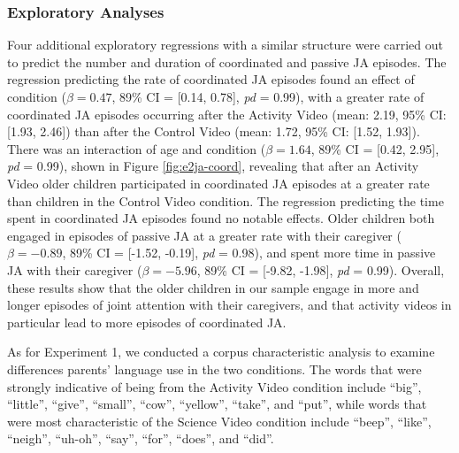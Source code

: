 \documentclass[man,floatsintext]{apa6}
\begin{document}
\hypertarget{exploratory-analyses-1}{%
\subsubsection{Exploratory Analyses}\label{exploratory-analyses-1}}

Four additional exploratory regressions with a similar structure were carried out to predict the number and duration of coordinated and passive JA episodes.
The regression predicting the rate of coordinated JA episodes found an effect of condition (\(\beta=0.47\), 89\% CI = {[}0.14, 0.78{]}, \emph{pd} = 0.99), with a greater rate of coordinated JA episodes occurring after the Activity Video (mean: 2.19, 95\% CI: {[}1.93, 2.46{]}) than after the Control Video (mean: 1.72, 95\% CI: {[}1.52, 1.93{]}).
There was an interaction of age and condition (\(\beta=1.64\), 89\% CI = {[}0.42, 2.95{]}, \emph{pd} = 0.99), shown in Figure \ref{fig:e2ja-coord}, revealing that after an Activity Video older children participated in coordinated JA episodes at a greater rate than children in the Control Video condition.
The regression predicting the time spent in coordinated JA episodes found no notable effects.
Older children both engaged in episodes of passive JA at a greater rate with their caregiver (\(\beta=-0.89\), 89\% CI = {[}-1.52, -0.19{]}, \emph{pd} = 0.98), and spent more time in passive JA with their caregiver (\(\beta=-5.96\), 89\% CI = {[}-9.82, -1.98{]}, \emph{pd} = 0.99).
Overall, these results show that the older children in our sample engage in more and longer episodes of joint attention with their caregivers, and that activity videos in particular lead to more episodes of coordinated JA.

As for Experiment 1, we conducted a corpus characteristic analysis to examine differences parents' language use in the two conditions.
The words that were strongly indicative of being from the Activity Video condition include \enquote{big}, \enquote{little}, \enquote{give}, \enquote{small}, \enquote{cow}, \enquote{yellow}, \enquote{take}, and \enquote{put}, while words that were most characteristic of the Science Video condition include \enquote{beep}, \enquote{like}, \enquote{neigh}, \enquote{uh-oh}, \enquote{say}, \enquote{for}, \enquote{does}, and \enquote{did}.
\end{document}
